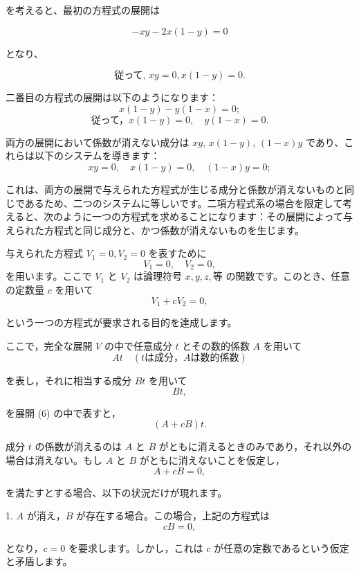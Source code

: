 \documentclass[a4paper,11pt,openany]{ltjsbook}
\begin{document}
を考えると、最初の方程式の展開は

\[
- xy - 2x (1 - y) = 0
\]

となり、

\begin{equation}
\textrm{従って, }xy = 0, x (1 - y) = 0.
\end{equation}

二番目の方程式の展開は以下のようになります：
\[
x(1-y) - y(1-x) = 0;
\]
\begin{equation}
\textrm{従って，} x(1-y) = 0, \quad y(1-x) = 0.
\end{equation}

両方の展開において係数が消えない成分は $xy$, $x(1-y)$, $(1-x)y$ であり、これらは以下のシステムを導きます：
\begin{equation}
xy = 0, \quad x(1-y) = 0, \quad (1-x)y = 0;
\end{equation}

これは、両方の展開で与えられた方程式が生じる成分と係数が消えないものと同じであるため、二つのシステムに等しいです。二項方程式系の場合を限定して考えると、次のように一つの方程式を求めることになります：その展開によって与えられた方程式と同じ成分と、かつ係数が消えないものを生じます。

与えられた方程式 $V_1 = 0, V_2 = 0$ を表すために
\[
V_1 = 0, \quad V_2 = 0,
\]
を用います。ここで $V_1$ と $V_2$ は論理符号 $x, y, z, 等$ の関数です。このとき、任意の定数量 $c$ を用いて
\begin{equation}
V_1 + cV_2 = 0,
\end{equation}

という一つの方程式が要求される目的を達成します。

ここで，完全な展開 $V$ の中で任意成分 $t$ とその数的係数 $A$ を用いて
\[
At \quad (t \textrm{は成分，} A \textrm{は数的係数})
\]

を表し，それに相当する成分 $Bt$ を用いて
\[
Bt,
\]

を展開 (6) の中で表すと，
\[
(A + cB)t.
\]

成分 $t$ の係数が消えるのは $A$ と $B$ がともに消えるときのみであり，それ以外の場合は消えない。もし $A$ と $B$ がともに消えないことを仮定し，
\begin{equation}
A + cB = 0,
\end{equation}

を満たすとする場合、以下の状況だけが現れます。

1. $A$ が消え，$B$ が存在する場合。この場合，上記の方程式は
\[
cB = 0,
\]

となり，$c = 0$ を要求します。しかし，これは $c$ が任意の定数であるという仮定と矛盾します。
\end{document}
